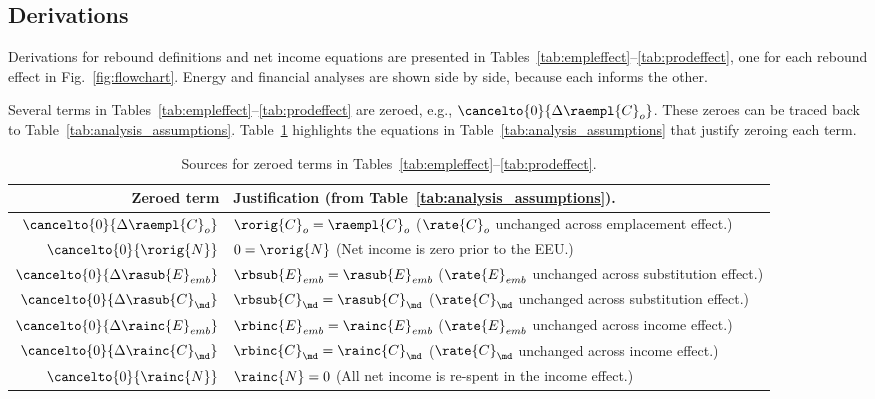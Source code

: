 


\subsection{Derivations}
\label{sec:derivations}

Derivations for rebound definitions and net income equations
are presented in Tables~\ref{tab:empleffect}--\ref{tab:prodeffect},
one for each rebound effect in Fig.~\ref{fig:flowchart}.
Energy and financial analyses are shown side by side, because
each informs the other.

Several terms in Tables~\ref{tab:empleffect}--\ref{tab:prodeffect}
are zeroed, e.g., $\cancelto{0}{\Delta \raempl{C}_o}$. 
These zeroes can be traced back to Table~\ref{tab:analysis_assumptions}.
Table~\ref{tab:zeroed_terms} highlights the equations
in Table~\ref{tab:analysis_assumptions}
that justify zeroing each term.

\begin{table}
\centering %
\caption{Sources for zeroed terms in Tables~\ref{tab:empleffect}--\ref{tab:prodeffect}.}
\begin{tabular}{r l}
  \toprule
  Zeroed term & Justification (from Table~\ref{tab:analysis_assumptions}). \\
  \midrule
  $\cancelto{0}{\Delta \raempl{C}_o}$    & $\rorig{C}_o = \raempl{C}_o$ ($\rate{C}_o$ unchanged across emplacement effect.) \\
  $\cancelto{0}{\rorig{N}}$              & $0 = \rorig{N}$ (Net income is zero prior to the EEU.) \\
  $\cancelto{0}{\Delta \rasub{E}_{emb}}$ & $\rbsub{E}_{emb} = \rasub{E}_{emb}$ ($\rate{E}_{emb}$ unchanged across substitution effect.) \\
  $\cancelto{0}{\Delta \rasub{C}_{\md}}$ & $\rbsub{C}_{\md} = \rasub{C}_{\md}$ ($\rate{C}_{\md}$ unchanged across substitution effect.) \\
  $\cancelto{0}{\Delta \rainc{E}_{emb}}$ & $\rbinc{E}_{emb} = \rainc{E}_{emb}$ ($\rate{E}_{emb}$ unchanged across income effect.) \\
  $\cancelto{0}{\Delta \rainc{C}_{\md}}$ & $\rbinc{C}_{\md} = \rainc{C}_{\md}$ ($\rate{C}_{\md}$ unchanged across income effect.) \\
  $\cancelto{0}{\rainc{N}}$              & $\rainc{N} = 0$ (All net income is re-spent in the income effect.) \\
  \bottomrule
\end{tabular}
\label{tab:zeroed_terms}
\end{table}



